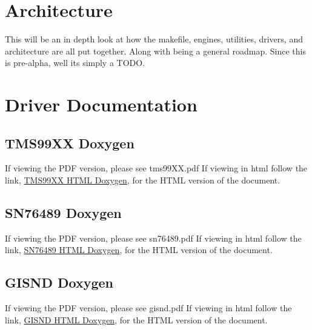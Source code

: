 \documentclass{article}
\begin{document}
  \section{Architecture}

  \par
  This will be an in depth look at how the makefile, engines, utilities, drivers, and architecture are all put together. Along with being a general roadmap. Since this is
  pre-alpha, well its simply a TODO.

  \newpage

  \section{Driver Documentation}

  \subsection{TMS99XX Doxygen}
  \par
  If viewing the PDF version, please see tms99XX.pdf
  If viewing in html follow the link,
  \href{https://sparkletron.github.io/RODAC/manual/dox/tms99XX/html/index.html}{TMS99XX HTML Doxygen},
  for the HTML version of the document.

  \subsection{SN76489 Doxygen}
  \par
   If viewing the PDF version, please see sn76489.pdf
   If viewing in html follow the link,
  \href{https://sparkletron.github.io/RODAC/manual/dox/sn76489/html/index.html}{SN76489 HTML Doxygen},
  for the HTML version of the document.

  \subsection{GISND Doxygen}
  \par
   If viewing the PDF version, please see gisnd.pdf
   If viewing in html follow the link,
  \href{https://sparkletron.github.io/RODAC/manual/dox/gisnd/html/index.html}{GISND HTML Doxygen},
  for the HTML version of the document.
\end{document}
